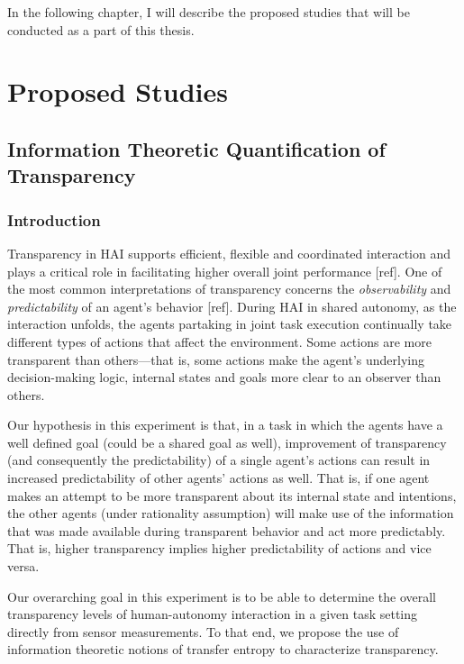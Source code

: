 \documentclass[12pt]{article}
\begin{document}
In the following chapter, I will describe the proposed studies that will be conducted as a part of this thesis. 

\pagebreak
\section{Proposed Studies}
\subsection{Information Theoretic Quantification of  Transparency}\label{study:rq1}

\subsubsection{Introduction}
Transparency in HAI supports efficient, flexible and coordinated interaction and plays a critical role in facilitating higher overall joint performance [ref]. One of the most common interpretations of transparency concerns the \textit{observability} and \textit{predictability} of an agent's behavior [ref]. During HAI in shared autonomy, as the interaction unfolds, the agents partaking in joint task execution continually take different types of actions that affect the environment. Some actions are more transparent than others---that is, some actions make the agent's underlying decision-making logic, internal states and goals more clear to an observer than others. 

Our hypothesis in this experiment is that, in a task in which the agents have a well defined goal (could be a shared goal as well), improvement of transparency (and consequently the predictability) of a single agent's actions can result in increased predictability of other agents' actions as well. That is, if one agent makes an attempt to be more transparent about its internal state and intentions, the other agents (under rationality assumption) will make use of the information that was made available during transparent behavior and act more predictably. That is, higher transparency implies higher predictability of actions and vice versa.  

Our overarching goal in this experiment is to be able to determine the overall transparency levels of human-autonomy interaction in a given task setting directly from sensor measurements. To that end, we propose the use of information theoretic notions of transfer entropy to characterize transparency. 
%
%
\end{document}
